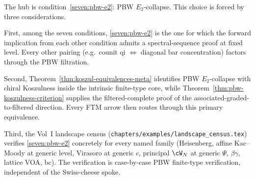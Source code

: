 The hub is condition~\ref{seven:pbw-e2}: PBW $E_2$-collapse. This
choice is forced by three considerations.

First, among the seven conditions, \ref{seven:pbw-e2} is the one for
which the forward implication from each other condition admits a
spectral-sequence proof at fixed level. Every other pairing (e.g.\
counit qi $\Leftrightarrow$ diagonal bar concentration) factors
through the PBW filtration.

Second, Theorem~\ref{thm:koszul-equivalences-meta} identifies
PBW $E_2$-collapse with chiral Koszulness inside the intrinsic
finite-type core, while
Theorem~\ref{thm:pbw-koszulness-criterion} supplies the
filtered-complete proof of the associated-graded-to-filtered
direction.  Every FTM arrow then routes through this primary
equivalence.

Third, the Vol~I landscape census
(\texttt{chapters/examples/landscape\_census.tex}) verifies
\ref{seven:pbw-e2} concretely for every named family (Heisenberg,
affine Kac--Moody at generic level, Virasoro at generic
$c$, principal $\cW_N$ at generic $\Psi$, $\beta\gamma$, lattice VOA,
bc).  The verification is case-by-case PBW finite-type verification,
independent of the Swiss-cheese spoke.

